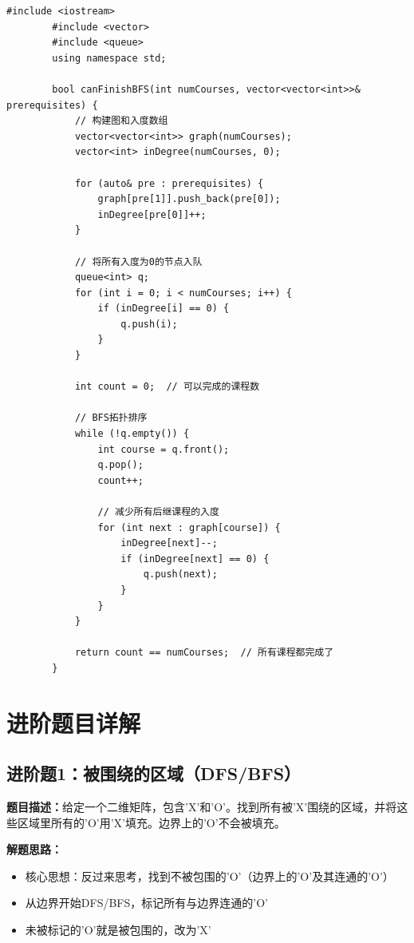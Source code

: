 \documentclass[12pt,a4paper]{article}
\begin{document}
	\begin{lstlisting}[caption={例题4变体：课程表 - BFS拓扑排序}]
		#include <iostream>
		#include <vector>
		#include <queue>
		using namespace std;
		
		bool canFinishBFS(int numCourses, vector<vector<int>>& prerequisites) {
			// 构建图和入度数组
			vector<vector<int>> graph(numCourses);
			vector<int> inDegree(numCourses, 0);
			
			for (auto& pre : prerequisites) {
				graph[pre[1]].push_back(pre[0]);
				inDegree[pre[0]]++;
			}
			
			// 将所有入度为0的节点入队
			queue<int> q;
			for (int i = 0; i < numCourses; i++) {
				if (inDegree[i] == 0) {
					q.push(i);
				}
			}
			
			int count = 0;  // 可以完成的课程数
			
			// BFS拓扑排序
			while (!q.empty()) {
				int course = q.front();
				q.pop();
				count++;
				
				// 减少所有后继课程的入度
				for (int next : graph[course]) {
					inDegree[next]--;
					if (inDegree[next] == 0) {
						q.push(next);
					}
				}
			}
			
			return count == numCourses;  // 所有课程都完成了
		}
	\end{lstlisting}
	
	\section{进阶题目详解}
	
	\subsection{进阶题1：被围绕的区域（DFS/BFS）}
	
	\textbf{题目描述：}给定一个二维矩阵，包含'X'和'O'。找到所有被'X'围绕的区域，并将这些区域里所有的'O'用'X'填充。边界上的'O'不会被填充。
	
	\textbf{解题思路：}
	\begin{itemize}
		\item 核心思想：反过来思考，找到不被包围的'O'（边界上的'O'及其连通的'O'）
		\item 从边界开始DFS/BFS，标记所有与边界连通的'O'
		\item 未被标记的'O'就是被包围的，改为'X'
	\end{itemize}
	
\end{document}
